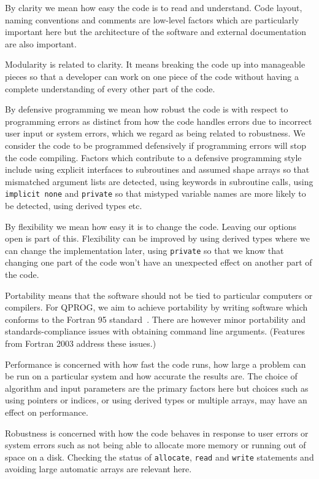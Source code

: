 \documentclass[11pt,twoside,a4paper]{report}
\def\coden{QPROG} %
\begin{document}
By clarity we mean how easy the code is to read and understand.
Code layout, naming conventions and comments are low-level factors
which are particularly important here but the architecture of the
software and external documentation are also important.

Modularity is related to clarity. It means breaking the code up
into manageable pieces so that a developer can work on one piece of the
code without having a complete understanding of every other part of
the code.

By defensive programming we mean how robust the code is with respect
to programming errors as distinct from how the code handles errors due
to incorrect user input or system errors, which we regard as being
related to robustness.  We consider the code to be programmed
defensively if programming errors will stop the code
compiling. Factors which contribute to a defensive programming style
include using explicit interfaces to subroutines and assumed shape
arrays so that mismatched argument lists are detected, using keywords
in subroutine calls, using \verb|implicit none| and \verb|private| so
that mistyped variable names are more likely to be detected, using
derived types etc.

By flexibility we mean how easy it is to change the code. Leaving our
options open is part of this. Flexibility can be improved by using
derived types where we can change the implementation later, 
using \verb|private| so that we know that changing one part of the
code won't have an unexpected effect on another part of the code.

Portability means that the software should not be tied to particular
computers or compilers. For \coden, we aim to achieve portability by
writing software which conforms to the Fortran 95
standard~\cite{ISO1539}. There are however minor portability and
standards-compliance issues with obtaining command line arguments.
(Features from Fortran 2003 address these issues.)

Performance is concerned with how fast the code runs, how large a
problem can be run on a particular system and how accurate the results
are. The choice of algorithm and input parameters are the primary
factors here but choices such as using pointers or indices, or using derived
types or multiple arrays, may have an effect on performance.

Robustness is concerned with how the code behaves in response to user
errors or system errors such as not being able to allocate more memory
or running out of space on a disk. Checking the status of
\verb|allocate|, \verb|read| and \verb|write| statements and avoiding
large automatic arrays are relevant here.
\end{document}

